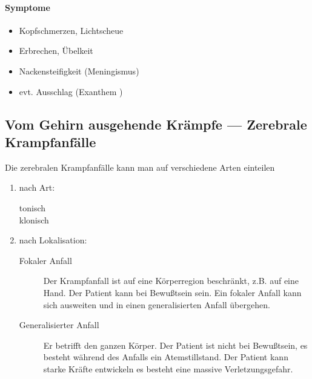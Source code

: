 \paragraph{Symptome}

\begin{itemize}
    \item Kopfschmerzen, Lichtscheue
    \item Erbrechen, \"Ubelkeit
    \item Nackensteifigkeit (Meningismus)
    \item evt. Ausschlag (Exanthem )
\end{itemize}



\subsection{Vom Gehirn ausgehende Krämpfe --- Zerebrale Krampfanfälle}


Die zerebralen Krampfanfälle kann man auf verschiedene Arten einteilen

\begin{enumerate}
    \item nach Art:
    \begin{description}
        \item[tonisch]
        \item[klonisch]
    \end{description}
    \item nach Lokalisation:
    
    \begin{description}
        \item [Fokaler Anfall] Der Krampfanfall ist auf eine Körperregion beschränkt, z.B. auf eine Hand. Der Patient kann bei Bewußtsein sein.
       Ein fokaler Anfall kann sich ausweiten und in einen generalisierten Anfall übergehen. 
        
        \item [Generalisierter Anfall] Er betrifft den ganzen Körper. Der
        Patient ist nicht bei Bewußtsein, es besteht während des Anfalls
        ein Atemstillstand. Der Patient kann starke Kräfte entwickeln es besteht eine massive Verletzungsgefahr.    
        
    \end{description}
    \end{enumerate}

